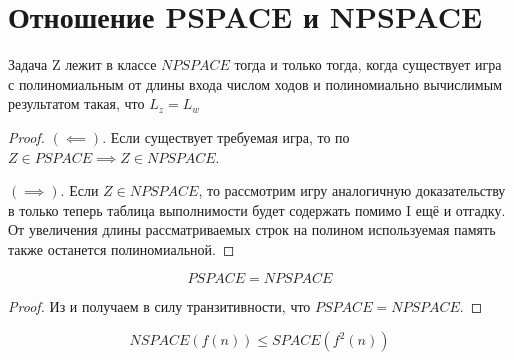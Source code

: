 \section{Отношение PSPACE и NPSPACE}
\begin{theorem}
Задача Z лежит в классе $NPSPACE$ тогда и только тогда, когда существует игра с
полиномиальным от длины входа числом ходов и полиномиально вычислимым
результатом такая, что $L_z=L_w$	
\end{theorem}
\begin{proof}
	$(\impliedby)$. Если существует требуемая игра, то по
	  $Z \in PSPACE \implies Z \in NPSPACE$. 

	$(\implies)$. Если $Z\in NPSPACE$, то рассмотрим игру аналогичную
	доказательству в  только теперь таблица выполнимости
	будет содержать помимо I ещё и отгадку. От увеличения длины
	рассматриваемых строк на полином используемая память также останется
	полиномиальной. 
\end{proof}
\begin{theorem}
\[PSPACE = NPSPACE\]
\end{theorem}
\begin{proof}
	Из  и  получаем в силу
	транзитивности, что  $PSPACE = NPSPACE$.
\end{proof}

\begin{theorem}
	\[NSPACE(f(n)) \le SPACE(f^2(n))\]
\end{theorem}
